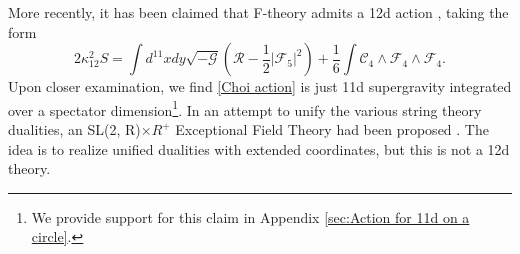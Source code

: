 More recently, it has been claimed that F-theory \cite{Vafa:1996xn} admits a 12d action \cite{Choi:2014vya,Choi:2015gia}, taking the form
\begin{equation}
2\kappa_{12}^2S = \int d^{11}x dy \sqrt{-\mathcal G}
\left(
\mathcal R-\frac{1}{2}|\mathcal F_5|^2
\right)
+\frac{1}{6}
\int \mathcal C_4\wedge \mathcal{F}_4 \wedge \mathcal{F}_4.
\label{Choi action}
\end{equation}
Upon closer examination, we find \eqref{Choi action} is just 11d supergravity integrated over a spectator dimension\footnote{
We provide support for this claim in Appendix \ref{sec:Action for 11d on a circle}.
}.
In an attempt to unify the various string theory dualities, an SL(2, R)$\times R^+$ Exceptional Field Theory had been proposed \cite{Berman:2015rcc,Rudolph:2017vzy}.
The idea is to realize unified dualities with extended coordinates, but this is not a 12d theory.